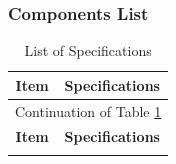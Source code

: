 \documentclass[11pt]{article}
\begin{document}
        \subsubsection{Components List}
            \begin{longtable}[c]{| c | c |}
                \caption{List of Specifications\label{specifications}}\\
                \hline
                \textbf{Item} & \textbf{Specifications} \\
                \hline
                \endfirsthead

                \hline
                 \multicolumn{2}{|c|}{Continuation of Table \ref{specifications}}\\
                 \hline
                 \textbf{Item} & \textbf{Specifications} \\
                 \hline
                 \endhead
                
                 \hline
                 \endfoot
                

\end{longtable}
\end{document}
